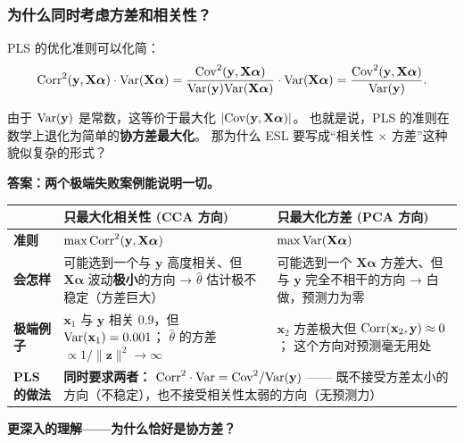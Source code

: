 \subsubsection{为什么同时考虑方差和相关性？}

PLS 的优化准则可以化简：
\[
    \mathrm{Corr}^2(\mathbf{y}, \mathbf{X}\bm{\alpha}) \cdot \mathrm{Var}(\mathbf{X}\bm{\alpha})
    = \frac{\mathrm{Cov}^2(\mathbf{y}, \mathbf{X}\bm{\alpha})}{\mathrm{Var}(\mathbf{y})\mathrm{Var}(\mathbf{X}\bm{\alpha})}
      \cdot \mathrm{Var}(\mathbf{X}\bm{\alpha})
    = \frac{\mathrm{Cov}^2(\mathbf{y}, \mathbf{X}\bm{\alpha})}{\mathrm{Var}(\mathbf{y})}.
\]

由于 $\mathrm{Var}(\mathbf{y})$ 是常数，这等价于最大化 $|\mathrm{Cov}(\mathbf{y}, \mathbf{X}\bm{\alpha})|$。
也就是说，PLS 的准则在数学上退化为简单的\textbf{协方差最大化}。
那为什么 ESL 要写成``相关性 $\times$ 方差''这种貌似复杂的形式？

\medskip
\noindent
\textbf{答案：两个极端失败案例能说明一切。}

\begin{center}
\renewcommand{\arraystretch}{1.5}
\begin{tabular}{p{3.5cm}|p{5cm}|p{5cm}}
\toprule
& \textbf{只最大化相关性 (CCA 方向)} & \textbf{只最大化方差 (PCA 方向)} \\
\midrule
\textbf{准则}    & $\max \mathrm{Corr}^2(\mathbf{y}, \mathbf{X}\bm{\alpha})$ & $\max \mathrm{Var}(\mathbf{X}\bm{\alpha})$ \\
\midrule
\textbf{会怎样}  & 可能选到一个与 $\mathbf{y}$ 高度相关、但 $\mathbf{X}\bm{\alpha}$ 波动\textbf{极小}的方向
                   → $\hat{\theta}$ 估计极不稳定（方差巨大）&
                   可能选到一个 $\mathbf{X}\bm{\alpha}$ 方差大、但与 $\mathbf{y}$ 完全不相干的方向
                   → 白做，预测力为零 \\
\midrule
\textbf{极端例子} & $\mathbf{x}_1$ 与 $\mathbf{y}$ 相关 $0.9$，但 $\mathrm{Var}(\mathbf{x}_1) = 0.001$；
                   $\hat{\theta}$ 的方差 $\propto 1/\|\mathbf{z}\|^2 \to \infty$ &
                   $\mathbf{x}_2$ 方差极大但 $\mathrm{Corr}(\mathbf{x}_2, \mathbf{y}) \approx 0$；
                   这个方向对预测毫无用处 \\
\midrule
\textbf{PLS 的做法} & \multicolumn{2}{p{10cm}}{\textbf{同时要求两者：} $\mathrm{Corr}^2 \cdot \mathrm{Var} = \mathrm{Cov}^2 / \mathrm{Var}(\mathbf{y})$ —— 既不接受方差太小的方向（不稳定），也不接受相关性太弱的方向（无预测力）} \\
\bottomrule
\end{tabular}
\end{center}

\medskip
\noindent
\textbf{更深入的理解——为什么恰好是协方差？}

